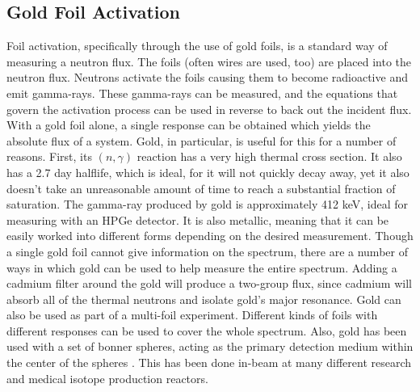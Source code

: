 \subsection{Gold Foil Activation}
Foil activation, specifically through the use of gold foils, is a standard way of measuring a neutron flux.
The foils (often wires are used, too) are placed into the neutron flux.
Neutrons activate the foils causing them to become radioactive and emit gamma-rays.
These gamma-rays can be measured, and the equations that govern the activation process can be used in reverse to back out the incident flux.
With a gold foil alone, a single response can be obtained which yields the absolute flux of a system.
Gold, in particular, is useful for this for a number of reasons.
First, its $(n, \gamma)$ reaction has a very high thermal cross section.
It also has a 2.7 day halflife, which is ideal, for it will not quickly decay away, yet it also doesn't take an unreasonable amount of time to reach a substantial fraction of saturation.
The gamma-ray produced by gold is approximately 412 keV, ideal for measuring with an HPGe detector.
It is also metallic, meaning that it can be easily worked into different forms depending on the desired measurement.
Though a single gold foil cannot give information on the spectrum, there are a number of ways in which gold can be used to help measure the entire spectrum.
Adding a cadmium filter around the gold will produce a two-group flux, since cadmium will absorb all of the thermal neutrons and isolate gold's major resonance.
Gold can also be used as part of a multi-foil experiment.
Different kinds of foils with different responses can be used to cover the whole spectrum.
Also, gold has been used with a set of bonner spheres, acting as the primary detection medium within the center of the spheres \cite{viererbl2012comparison} \cite{wang2008goldbonner}.
This has been done in-beam at many different research and medical isotope production reactors.

